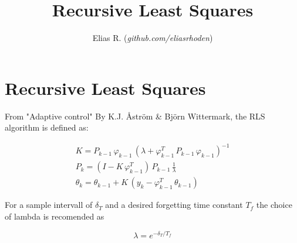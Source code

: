 \documentclass{article}
\title{Recursive Least Squares}
\author{Elias R. (\textit{github.com/eliasrhoden})}
\begin{document}
\maketitle

\section{Recursive Least Squares}
From "Adaptive control" By K.J. Åström \& Björn Wittermark, the RLS algorithm is defined as:

\begin{gather}
K = P_{k-1} \, \varphi_{k-1} \, (\lambda + \varphi_{k-1}^T \, P_{k-1} \, \varphi_{k-1})^{-1} \\
P_k = (I - K\, \varphi_{k-1}^T) \, P_{k-1} \, \frac{1}{\lambda} \\
\theta_k = \theta_{k-1} + K \, (y_k - \varphi_{k-1}^T \, \theta_{k-1})
\end{gather}

For a sample intervall of $\delta_T$ and a desired forgetting time constant $T_f$ the choice of lambda is recomended as

\begin{equation}
\lambda = e^{-\delta_T/T_f}
\end{equation}
\end{document}
